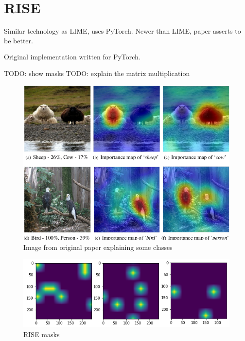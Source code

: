 \section{RISE}
Similar technology as LIME, uses PyTorch. Newer than LIME, paper asserts to be better.

Original implementation written for PyTorch.

TODO: show masks
TODO: explain the matrix multiplication

\begin{figure}[H]
\centering
\caption{Image from original paper explaining some classes}
\includegraphics[width=12cm]{chapters/02_methods/images/rise.png}
\end{figure}

\begin{figure}[H]
\centering
\caption{RISE masks}
\includegraphics[width=14cm]{chapters/02_methods/images/rise-masks.png}
\end{figure}
